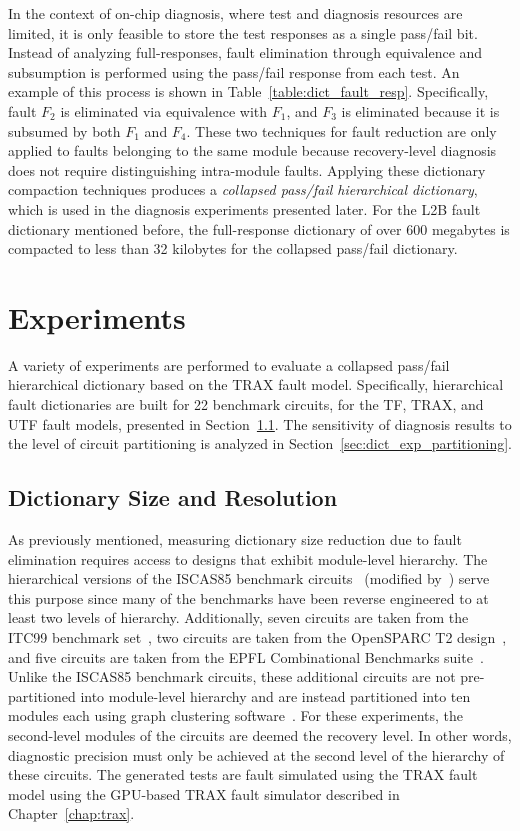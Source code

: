 In the context of on-chip diagnosis, where test and diagnosis resources are limited, it is only feasible to store the test responses as a single pass/fail bit.
%
Instead of analyzing full-responses, fault elimination through equivalence and subsumption is performed using the pass/fail response from each test.
%
An example of this process is shown in Table~\ref{table:dict_fault_resp}.
%
Specifically, fault $F_2$ is eliminated via equivalence with $F_1$, and $F_3$ is eliminated because it is subsumed by both $F_1$ and $F_4$.
%
These two techniques for fault reduction are only applied to faults belonging to the same module because recovery-level diagnosis does not require distinguishing intra-module faults.
%
Applying these dictionary compaction techniques produces a \textit{collapsed pass/fail hierarchical dictionary}, which is used in the diagnosis experiments presented later.
%
For the L2B fault dictionary mentioned before, the full-response dictionary of over 600 megabytes is compacted to less than 32 kilobytes for the collapsed pass/fail dictionary.


\section{Experiments}
\label{sec:dict_exp}
A variety of experiments are performed to evaluate a collapsed pass/fail hierarchical dictionary based on the TRAX fault model.
%
Specifically, hierarchical fault dictionaries are built for 22 benchmark circuits, for the TF, TRAX, and UTF fault models, presented in Section~\ref{sec:dict_exp_size_res}.
%
The sensitivity of diagnosis results to the level of circuit partitioning is analyzed in Section~\ref{sec:dict_exp_partitioning}.


\subsection{Dictionary Size and Resolution}
\label{sec:dict_exp_size_res}

As previously mentioned, measuring dictionary size reduction due to fault elimination requires access to designs that exhibit module-level hierarchy.
%
The hierarchical versions of the ISCAS85 benchmark circuits~\cite{brglez85} (modified by~\cite{hansen99}) serve this purpose since many of the benchmarks have been reverse engineered to at least two levels of hierarchy.
%
Additionally, seven circuits are taken from the ITC99 benchmark set~\cite{corno99}, two circuits are taken from the OpenSPARC T2 design~\cite{sun11}, and five circuits are taken from the EPFL Combinational Benchmarks suite~\cite{epfl}.
%
Unlike the ISCAS85 benchmark circuits, these additional circuits are not pre-partitioned into module-level hierarchy and are instead partitioned into ten modules each using graph clustering software~\cite{dhillon07}.
%
For these experiments, the second-level modules of the circuits are deemed the recovery level.
%
In other words, diagnostic precision must only be achieved at the second level of the hierarchy of these circuits.
%
The generated tests are fault simulated using the TRAX fault model using the GPU-based TRAX fault simulator described in Chapter~\ref{chap:trax}.


